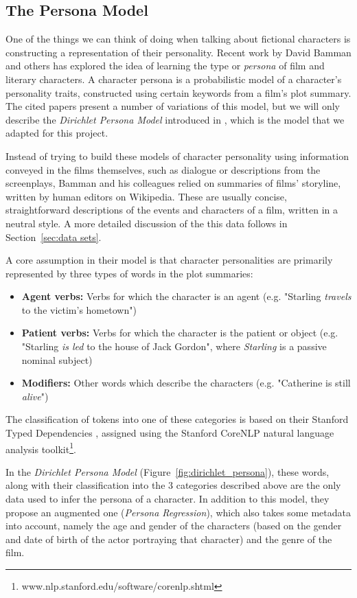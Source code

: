 \documentclass[bsc,frontabs,singlespacing,parskip, twoside]{infthesis}
\begin{document}
\subsection{The Persona Model}
\label{sec:bg_persona}
One of the things we can think of doing when talking about fictional characters is constructing a representation of their personality. Recent work by David Bamman and others has explored the idea of learning the type or \textit{persona} of film \cite{Bamman2013} and literary \cite{Bamman2014} characters. A character persona is a probabilistic model of a character's personality traits, constructed using certain keywords from a film's plot summary. The cited papers present a number of variations of this model, but we will only describe the \textit{Dirichlet Persona Model} introduced in \cite{Bamman2013}, which is the model that we adapted for this project.

Instead of trying to build these models of character personality using information conveyed in the films themselves, such as dialogue or descriptions from the screenplays, Bamman and his colleagues relied on summaries of films' storyline, written by human editors on Wikipedia. These are usually concise, straightforward descriptions of the events and characters of a film, written in a neutral style. A more detailed discussion of the this data follows in Section~\ref{sec:data sets}. 

A core assumption in their model is that character personalities are primarily represented by three types of words in the plot summaries:
\begin{itemize}
	\item \textbf{Agent verbs:} Verbs for which the character is an agent (e.g. "Starling \textit{travels} to the victim's hometown")
	\item \textbf{Patient verbs:} Verbs for which the character is the patient or object (e.g. "Starling \textit{is led} to the house of Jack Gordon", where \textit{Starling} is a passive nominal subject)
	\item \textbf{Modifiers:} Other words which describe the characters (e.g. "Catherine is still \textit{alive}")
\end{itemize}

The classification of tokens into one of these categories is based on their Stanford Typed Dependencies \cite{de2008stanford}, assigned using the Stanford CoreNLP natural language analysis toolkit\footnote{www.nlp.stanford.edu/software/corenlp.shtml}.

In the \textit{Dirichlet Persona Model} (Figure~\ref{fig:dirichlet_persona}), these words, along with their classification into the 3 categories described above are the only data used to infer the persona of a character. In addition to this model, they propose an augmented one (\textit{Persona Regression}), which also takes some metadata into account, namely the age and gender of the characters (based on the gender and date of birth of the actor portraying that character) and the genre of the film.
\end{document}
